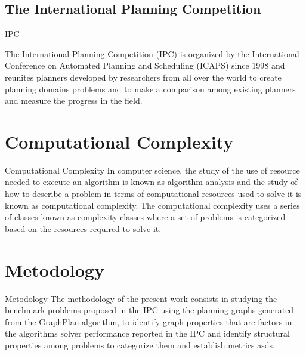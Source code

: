 \documentclass[handout,t]{beamer}
\begin{document}
\subsection{The International Planning Competition}
\begin{frame}{IPC}  

The International Planning Competition (IPC) is organized by the
International Conference on Automated Planning and Scheduling (ICAPS)
since 1998 and reunites planners developed by researchers from all
over the world to create planning domains problems and to make a
comparison among existing planners and measure the progress in the
field.

\end{frame}
\section{Computational Complexity}
\begin{frame}{Computational Complexity}
In computer science, the study of the use of resource needed to
execute an algorithm is known as algorithm analysis and the study of
how to describe a problem in terms of computational resources used to
solve it is known as computational complexity. The
computational complexity uses a series of classes known as complexity
classes where a set of problems is categorized based on the resources
required to solve it.
\end{frame}
\section{Metodology}
\begin{frame}{Metodology}
  The methodology of the present work consists in studying the
  benchmark problems proposed in the IPC using the planning graphs
  generated from the GraphPlan algorithm, to identify graph properties
  that are factors in the algorithms solver performance reported in
  the IPC and identify structural properties among problems to
  categorize them and establish metrics asds.
\end{frame}

\end{document}
